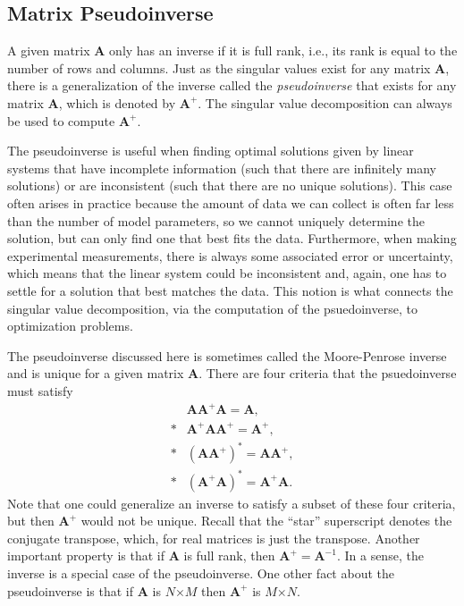 \subsection{Matrix Pseudoinverse}

A given matrix $\mathbf{A}$ only has an inverse if it is full rank, i.e., its rank is equal to the number of rows and columns. Just as the singular values exist for any matrix $\mathbf{A}$, there is a generalization of the inverse called the \emph{pseudoinverse} that exists for any matrix $\mathbf{A}$, which is denoted by $\mathbf{A}^+$. The singular value decomposition can always be used to compute $\mathbf{A}^+$.

The pseudoinverse is useful when finding optimal solutions given by linear systems that have incomplete information (such that there are infinitely many solutions) or are inconsistent (such that there are no unique solutions). This case often arises in practice because the amount of data we can collect is often far less than the number of model parameters, so we cannot uniquely determine the solution, but can only find one that best fits the data. Furthermore, when making experimental measurements, there is always some associated error or uncertainty, which means that the linear system could be inconsistent and, again, one has to settle for a solution that best matches the data. This notion is what connects the singular value decomposition, via the computation of the psuedoinverse, to optimization problems.

The pseudoinverse discussed here is sometimes called the Moore-Penrose inverse and is unique for a given matrix $\mathbf{A}$. There are four criteria that the psuedoinverse must satisfy
\begin{subequations}
\begin{align}
  &\mathbf{A} \mathbf{A}^+ \mathbf{A} = \mathbf{A}, \\*
  &\mathbf{A}^+ \mathbf{A} \mathbf{A}^+ = \mathbf{A}^+, \\*
  &\left( \mathbf{A} \mathbf{A}^+ \right)^* = \mathbf{A} \mathbf{A}^+ , \\*
  &\left( \mathbf{A}^+ \mathbf{A} \right)^* = \mathbf{A}^+ \mathbf{A} .  
\end{align}
\end{subequations}
Note that one could generalize an inverse to satisfy a subset of these four criteria, but then $\mathbf{A}^+$ would not be unique. Recall that the ``star'' superscript denotes the conjugate transpose, which, for real matrices is just the transpose. Another important property is that if $\mathbf{A}$ is full rank, then $\mathbf{A}^+ = \mathbf{A}^{-1}$. In a sense, the inverse is a special case of the pseudoinverse. One other fact about the pseudoinverse is that if $\mathbf{A}$ is $N$$\times$$M$ then $\mathbf{A}^+$ is $M$$\times$$N$.

